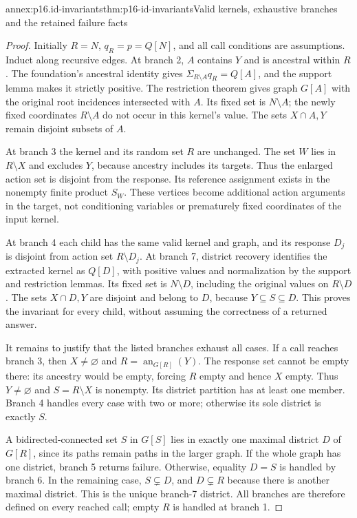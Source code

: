 \begin{annexitem}{annex:p16.id-invariants}{thm:p16-id-invariants}{Valid kernels, exhaustive branches and the retained failure facts}
\begin{proof}
Initially \(R=N\), \(q_R=p=Q[N]\), and all call conditions
are assumptions. Induct along recursive edges. At branch 2,
\(A\) contains \(Y\) and is ancestral within \(R\).
The foundation's ancestral identity gives
\(\Sigma_{R\setminus A}q_R=Q[A]\), and the support lemma
makes it strictly positive. The restriction theorem gives graph
\(G[A]\) with the original root incidences intersected with \(A\).
Its fixed set is \(N\setminus A\); the newly fixed coordinates
\(R\setminus A\) do not occur in this kernel's value. The sets
\(X\cap A,Y\) remain disjoint subsets of \(A\).

At branch 3 the kernel and its random set \(R\) are unchanged.
The set \(W\) lies in \(R\setminus X\) and excludes \(Y\),
because ancestry includes its targets. Thus the enlarged action
set is disjoint from the response. Its reference assignment exists
in the nonempty finite product \(S_W\). These vertices become
additional action arguments in the target, not conditioning variables
or prematurely fixed coordinates of the input kernel.

At branch 4 each child has the same valid kernel and graph, and
its response \(D_j\) is disjoint from action set \(R\setminus D_j\).
At branch 7, district recovery identifies the extracted kernel as
\(Q[D]\), with positive values and normalization by the support
and restriction lemmas. Its fixed set is \(N\setminus D\),
including the original values on \(R\setminus D\). The sets
\(X\cap D,Y\) are disjoint and belong to \(D\), because
\(Y\subseteq S\subseteq D\). This proves the invariant for
every child, without assuming the correctness of a returned answer.

It remains to justify that the listed branches exhaust all cases.
If a call reaches branch 3, then \(X\ne\varnothing\) and
\(R=\operatorname{an}_{G[R]}(Y)\). The response set cannot be
empty there: its ancestry would be empty, forcing \(R\) empty
and hence \(X\) empty. Thus \(Y\ne\varnothing\) and
\(S=R\setminus X\) is nonempty. Its district partition has
at least one member. Branch 4 handles every case with two or more;
otherwise its sole district is exactly \(S\).

A bidirected-connected set \(S\) in \(G[S]\) lies in exactly
one maximal district \(D\) of \(G[R]\), since its paths remain
paths in the larger graph. If the whole graph has one district,
branch 5 returns failure. Otherwise, equality \(D=S\) is handled
by branch 6. In the remaining case, \(S\subsetneq D\), and
\(D\subsetneq R\) because there is another maximal district.
This is the unique branch-7 district. All branches are therefore
defined on every reached call; empty \(R\) is handled at branch 1.


\end{proof}
\end{annexitem}
